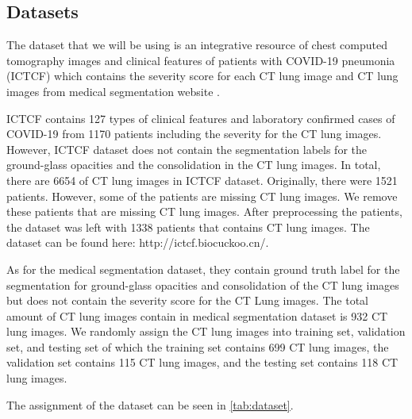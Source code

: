 \subsection{Datasets}
The dataset that we will be using is an integrative resource of chest computed tomography images and clinical features of patients with COVID-19 pneumonia (ICTCF) \cite{ref23} which contains the severity score for each CT lung image and CT lung images from medical segmentation website \cite{ref26}. 

ICTCF contains 127 types of clinical features and laboratory confirmed cases of COVID-19 from 1170 patients including the severity for the CT lung images. However, ICTCF dataset does not contain the segmentation labels for the ground-glass opacities and the consolidation in the CT lung images. In total, there are 6654 of CT lung images in ICTCF dataset. Originally, there were 1521 patients. However, some of the patients are missing CT lung images. We remove these patients that are missing CT lung images. After preprocessing the patients, the dataset was left with 1338 patients that contains CT lung images. The dataset can be found here: http://ictcf.biocuckoo.cn/. 

As for the medical segmentation dataset, they contain ground truth label for the segmentation for ground-glass opacities and consolidation of the CT lung images but does not contain the severity score for the CT Lung images. The total amount of CT lung images contain in medical segmentation dataset is 932 CT lung images. We randomly assign the CT lung images into training set, validation set, and testing set of which the training set contains 699 CT lung images, the validation set contains 115 CT lung images, and the testing set contains 118 CT lung images. 

The assignment of the dataset can be seen in \ref{tab:dataset}.


